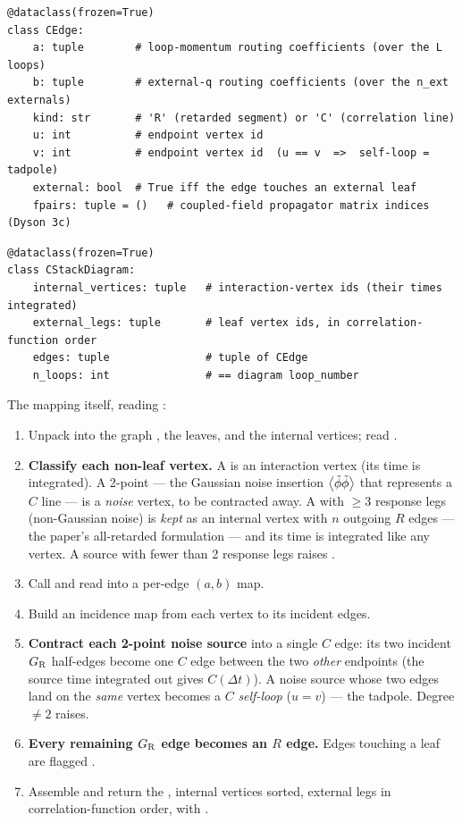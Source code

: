 \begin{lstlisting}
@dataclass(frozen=True)
class CEdge:
    a: tuple        # loop-momentum routing coefficients (over the L loops)
    b: tuple        # external-q routing coefficients (over the n_ext externals)
    kind: str       # 'R' (retarded segment) or 'C' (correlation line)
    u: int          # endpoint vertex id
    v: int          # endpoint vertex id  (u == v  =>  self-loop = tadpole)
    external: bool  # True iff the edge touches an external leaf
    fpairs: tuple = ()   # coupled-field propagator matrix indices (Dyson 3c)
\end{lstlisting}

\begin{lstlisting}
@dataclass(frozen=True)
class CStackDiagram:
    internal_vertices: tuple   # interaction-vertex ids (their times integrated)
    external_legs: tuple       # leaf vertex ids, in correlation-function order
    edges: tuple               # tuple of CEdge
    n_loops: int               # == diagram loop_number
\end{lstlisting}

The mapping itself, reading :

\begin{enumerate}
  \item Unpack  into the graph , the leaves, and the
        internal vertices; read .
  \item \textbf{Classify each non-leaf vertex.} A  is an
        interaction vertex (its time is integrated). A 2-point 
        --- the Gaussian noise insertion $\left\langle \tilde\phi\tilde\phi \right\rangle$ that
        represents a $C$ line --- is a \emph{noise} vertex, to be contracted away.
        A  with $\ge 3$ response legs (non-Gaussian noise) is
        \emph{kept} as an internal vertex with $n$ outgoing $R$ edges --- the
        paper's all-retarded formulation --- and its time is integrated like any
        vertex. A source with fewer than 2 response legs raises
        .
  \item Call  and read
         into a per-edge $(a,b)$ map.
  \item Build an incidence map from each vertex to its incident edges.
  \item \textbf{Contract each 2-point noise source} into a single $C$ edge: its
        two incident $G_{\mathrm R}$ half-edges become one $C$ edge between the two
        \emph{other} endpoints (the source time integrated out gives
        $C(\Delta t)$). A noise source whose two edges land on the \emph{same}
        vertex becomes a $C$ \emph{self-loop} ($u=v$) --- the tadpole. Degree
        $\ne 2$ raises.
  \item \textbf{Every remaining $G_{\mathrm R}$ edge becomes an $R$ edge.} Edges touching
        a leaf are flagged .
  \item Assemble and return the , internal vertices sorted,
        external legs in correlation-function order, with
        .
\end{enumerate}

